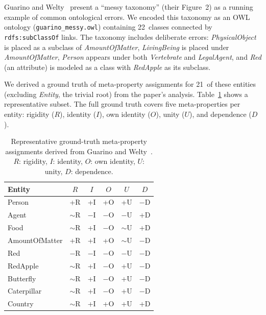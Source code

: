 \documentclass{IOS-Book-Article}
\begin{document}
Guarino and Welty~\cite{guarino2000formal} present a ``messy
taxonomy'' (their Figure~2) as a running example of common ontological
errors.  We encoded this taxonomy as an OWL ontology
(\texttt{guarino\_messy.owl}) containing 22~classes connected by
\texttt{rdfs:subClassOf} links.  The taxonomy includes deliberate
errors: \emph{PhysicalObject} is placed as a subclass of
\emph{AmountOfMatter}, \emph{LivingBeing} is placed under
\emph{AmountOfMatter}, \emph{Person} appears under both
\emph{Vertebrate} and \emph{LegalAgent}, and \emph{Red} (an
attribute) is modeled as a class with \emph{RedApple} as its subclass.

We derived a ground truth of meta-property assignments for 21~of
these entities (excluding \emph{Entity}, the trivial root) from the
paper's analysis.  Table~\ref{tab:guarino-gt} shows a representative
subset.  The full ground truth covers five meta-properties per entity:
rigidity ($R$), identity ($I$), own identity ($O$), unity ($U$), and
dependence ($D$).

\begin{table}[t]
  \caption{Representative ground-truth meta-property assignments
    derived from Guarino and Welty~\cite{guarino2000formal}.  $R$:
    rigidity, $I$: identity, $O$: own identity, $U$: unity, $D$:
    dependence.}
  \label{tab:guarino-gt}
  \centering
  \begin{tabular}{lccccc}
    \toprule
    Entity         & $R$     & $I$  & $O$  & $U$     & $D$  \\
    \midrule
    Person         & +R      & +I   & +O   & +U      & $-$D \\
    Agent          & $\sim$R & $-$I & $-$O & $-$U    & +D   \\
    Food           & $\sim$R & +I   & $-$O & $\sim$U & +D   \\
    AmountOfMatter & +R      & +I   & +O   & $\sim$U & $-$D \\
    Red            & $-$R    & $-$I & $-$O & $-$U    & $-$D \\
    RedApple       & $\sim$R & +I   & $-$O & +U      & $-$D \\
    Butterfly      & $\sim$R & +I   & $-$O & +U      & $-$D \\
    Caterpillar    & $\sim$R & +I   & $-$O & +U      & $-$D \\
    Country        & $\sim$R & +I   & +O   & +U      & +D   \\
    \bottomrule
  \end{tabular}
\end{table}
\end{document}
